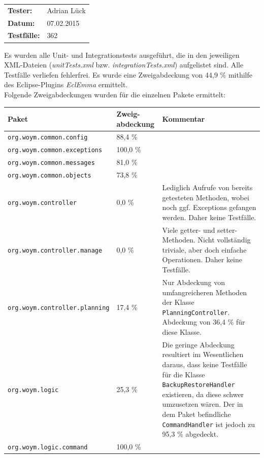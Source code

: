 \documentclass[fontsize=12pt,paper=a4,twoside]{scrartcl}
\renewcommand{\arraystretch}{1.2}
\begin{document}

\newpage

  \thispagestyle{fancy}
  \fancyhead{}
  \fancyfoot{}
  \renewcommand{\headrulewidth}{0.4pt}

\begin{tabular}{ll}
\textbf{Tester:} & Adrian Lück\\
\textbf{Datum:} & 07.02.2015\\
\textbf{Testfälle:} & 362 
\end{tabular}

Es wurden alle Unit- und Integrationstests ausgeführt, die in den jeweiligen XML-Dateien (\textit{unitTests.xml} bzw. \textit{integrationTests.xml}) aufgelistet sind. Alle Testfälle verliefen fehlerfrei. Es wurde eine Zweigabdeckung von 44,9 \% mithilfe des Eclipse-Plugins \textit{EclEmma} ermittelt.\\

Folgende Zweigabdeckungen wurden für die einzelnen Pakete ermittelt:

\renewcommand{\arraystretch}{1.3}
\begin{tabularx}{\textwidth}{|X|p{2cm}|X|}
\hline
\textbf{Paket} & \textbf{Zweig-abdeckung} & \textbf{Kommentar} \\\hline
\texttt{org.woym.common.config} & 88,4 \% & \\\hline
\texttt{org.woym.common.exceptions} & 100,0 \% & \\\hline
\texttt{org.woym.common.messages} & 81,0 \% & \\\hline
\texttt{org.woym.common.objects} & 73,8 \% &  \\\hline
\texttt{org.woym.controller} & 0,0 \% & Lediglich Aufrufe von bereits getesteten Methoden, wobei noch ggf. Exceptions gefangen werden. Daher keine Testfälle.\\\hline
\texttt{org.woym.controller.manage} & 0,0 \% & Viele getter- und setter-Methoden. Nicht vollständig triviale, aber doch einfache Operationen. Daher keine Testfälle. \\\hline
\texttt{org.woym.controller.planning} & 17,4 \% & Nur Abdeckung von umfangreicheren Methoden der Klasse \texttt{PlanningController}. Abdeckung von 36,4 \% für diese Klasse.\\\hline
\texttt{org.woym.logic} & 25,3 \% & Die geringe Abdeckung resultiert im Wesentlichen daraus, dass keine Testfälle für die Klasse \texttt{BackupRestoreHandler} existieren, da diese schwer umzusetzen wären. Der in dem Paket befindliche \texttt{CommandHandler} ist jedoch zu 95,3 \% abgedeckt.\\\hline
\texttt{org.woym.logic.command} & 100,0 \% & \\\hline
\end{tabularx}
\end{document}
